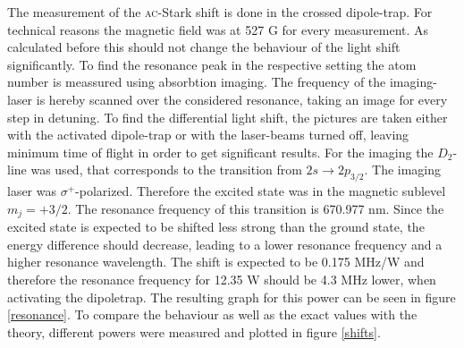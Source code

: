 The measurement of the \textsc{ac}-Stark shift is done in the crossed dipole-trap. For technical reasons the magnetic field was at 527 G for every measurement. As calculated before this should not change the behaviour of the light shift significantly. To find the resonance peak in the respective setting the atom number is meassured using absorbtion imaging. The frequency of the imaging-laser is hereby scanned over the considered resonance, taking an image for every step in detuning. To find the differential light shift, the pictures are taken either with the activated dipole-trap or with the laser-beams turned off, leaving minimum time of flight in order to get significant results. For the imaging the $D_2$-line was used, that corresponds to the transition from  $2s\rightarrow2p_{3/2}$. The imaging laser was $\sigma^+$-polarized. Therefore the excited state was in the magnetic sublevel $m_j=+3/2$. The resonance frequency of this transition is 670.977 nm. Since the excited state is expected to be shifted less strong than the ground state, the energy difference should decrease, leading to a lower resonance frequency and a higher resonance wavelength. The shift is expected to be 0.175 MHz/W and therefore the resonance frequency for 12.35 W should be 4.3 MHz lower, when activating the dipoletrap. The resulting graph for this power can be seen in figure \ref{resonance}. To compare the behaviour as well as the exact values with the theory, different powers were measured and plotted in figure \ref{shifts}. 


